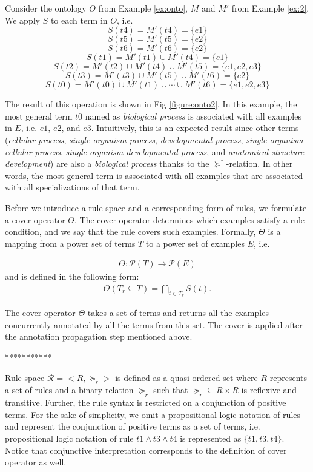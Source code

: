 \begin{example}\label{ex:3}
	Consider the ontology $O$ from Example \ref{ex:onto}, $M$ and $M'$ from Example \ref{ex:2}. We apply $S$ to each term in $O$, i.e.
	$$S(t4) = M'(t4) = \{e1\}$$
	$$S(t5) = M'(t5) = \{e2\}$$
	$$S(t6) = M'(t6) = \{e2\}$$
	$$S(t1) = M'(t1) \cup M'(t4) = \{e1\}$$
	$$S(t2) = M'(t2) \cup M'(t4) \cup M'(t5) = \{e1, e2, e3\}$$
	$$S(t3) = M'(t3) \cup M'(t5) \cup M'(t6) = \{e2\}$$
	$$S(t0) = M'(t0) \cup M'(t1) \cup \cdots \cup M'(t6) = \{e1, e2, e3\}$$
	
\end{example}
The result of this operation is shown in Fig \ref{figure:onto2}. In this example, the most general term $t0$ named as \emph{biological process} is associated with all examples in $E$, i.e. $e1$, $e2$, and $e3$. Intuitively, this is an expected result since other terms (\emph{cellular process}, \emph{single-organism process}, \emph{developmental process}, \emph{single-organism cellular process}, \emph{single-organism developmental process}, and \emph{anatomical structure development}) are also a \emph{biological process} thanks to the $\succeq^{*}$-relation. In other words, the most general term is associated with all examples that are associated with all specializations of that term.


Before we introduce a rule space and a corresponding form of rules, we formulate a cover operator $\Theta$. The cover operator determines which examples satisfy a rule condition, and we say that the rule covers such examples. Formally, $\Theta$ is a mapping from a power set of terms $T$ to a power set of examples $E$, i.e.

\begin{eqnarray}
\label{eq:thetamap}
\Theta : \mathcal{P}(T) \rightarrow \mathcal{P}(E)
\end{eqnarray}
and is defined in the following form:
\begin{eqnarray} \label{eq:cover}
\Theta (T_{r} \subseteq T) = \bigcap\limits_{t \in T_{r}} S(t) .
\end{eqnarray}


The cover operator $\Theta$ takes a set of terms and returns all the examples concurrently annotated by all the terms from this set. The cover is applied after the annotation propagation step mentioned above.

***********



Rule space $\mathcal{R} = <R, \succeq_{r}>$ is defined as a quasi-ordered set where $R$ represents a set of rules and a binary relation $\succeq_{r}$ such that $\succeq_{r} \subseteq R \times R$ is reflexive and transitive. Further, the rule syntax is restricted on a conjunction of positive terms. For the sake of simplicity, we omit a propositional logic notation of rules and represent the conjunction of positive terms as a set of terms, i.e. propositional logic notation of rule $t1 \wedge t3 \wedge t4$ is represented as $\{t1,t3,t4\}$. Notice that conjunctive interpretation corresponds to the definition of cover operator as well.

